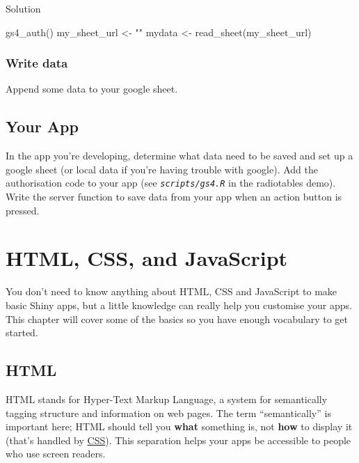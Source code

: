 \documentclass[
  oneside]{book}
\newenvironment{Shaded}{\begin{snugshade}}{\end{snugshade}}
\newcommand{\FunctionTok}[1]{\textcolor[rgb]{0.00,0.00,0.00}{#1}}
\newcommand{\NormalTok}[1]{#1}
\newcommand{\OtherTok}[1]{\textcolor[rgb]{0.56,0.35,0.01}{#1}}
\newcommand{\StringTok}[1]{\textcolor[rgb]{0.31,0.60,0.02}{#1}}
\begin{document}
Solution

\begin{Shaded}
\begin{Highlighting}[]
\FunctionTok{gs4\_auth}\NormalTok{()}
\NormalTok{my\_sheet\_url }\OtherTok{\textless{}{-}} \StringTok{""}
\NormalTok{mydata }\OtherTok{\textless{}{-}} \FunctionTok{read\_sheet}\NormalTok{(my\_sheet\_url)}
\end{Highlighting}
\end{Shaded}

\hypertarget{write-data}{%
\subsection*{Write data}\label{write-data}}

Append some data to your google sheet.

\hypertarget{your-app-data}{%
\section{Your App}\label{your-app-data}}

In the app you're developing, determine what data need to be saved and set up a google sheet (or local data if you're having trouble with google). Add the authorisation code to your app (see \textit{\texttt{scripts/gs4.R}} in the radiotables demo). Write the server function to save data from your app when an action button is pressed.

\hypertarget{web}{%
\chapter{HTML, CSS, and JavaScript}\label{web}}

You don't need to know anything about HTML, CSS and JavaScript to make basic Shiny apps, but a little knowledge can really help you customise your apps. This chapter will cover some of the basics so you have enough vocabulary to get started.

\hypertarget{html}{%
\section{HTML}\label{html}}

HTML stands for Hyper-Text Markup Language, a system for semantically tagging structure and information on web pages. The term ``semantically'' is important here; HTML should tell you \textbf{what} something is, not \textbf{how} to display it (that's handled by \protect\hyperlink{CSS}{CSS}). This separation helps your apps be accessible to people who use screen readers.
\end{document}
